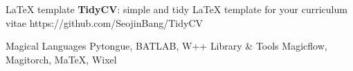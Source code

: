 \documentclass{tidycv} %
\begin{document}
\begin{cvworkings}
\end{cvworkings}
  
\begin{cvsoftwares}
  \cvsoftware
  {LaTeX template} %
  {{\bf TidyCV}: simple and tidy LaTeX template for your curriculum vitae} %
  {https://github.com/SeojinBang/TidyCV} %
\end{cvsoftwares}

\begin{cvtechnicalstrengths}
  \cvtechnicalstrength
  {Magical Languages} %
  {Pytongue, BATLAB, W++} %
  \cvtechnicalstrength
  {Library \& Tools} %
  {Magicflow, Magitorch, MaTeX, Wixel} %
\end{cvtechnicalstrengths}
\end{document}
